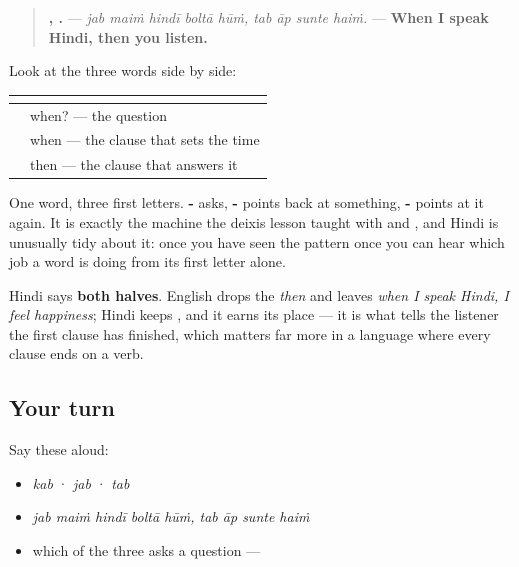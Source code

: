 \begin{grammarlens}[title={Grammar Lens: three first letters, one word}]
\begin{quote}
\textbf{    ,    .} — \emph{jab maiṁ hindī boltā hūṁ, tab āp sunte haiṁ.} — \textbf{When I speak Hindi, then you listen.}
\end{quote}

Look at the three words side by side:

\noindent
\begin{tabularx}{\linewidth}{@{}>{\raggedright\arraybackslash}X>{\raggedright\arraybackslash}X@{}}
\toprule
\textbf{} & \textbf{} \\
\midrule
\textbf{\hi{कब}} & when? — the question \\
\textbf{\hi{जब}} & when — the clause that sets the time \\
\textbf{\hi{तब}} & then — the clause that answers it \\
\bottomrule
\end{tabularx}

One word, three first letters. \textbf{-} asks, \textbf{-} points back at something, \textbf{-} points at it again. It is exactly the machine the deixis lesson taught with \textbf{} and \textbf{}, and Hindi is unusually tidy about it: once you have seen the pattern once you can hear which job a word is doing from its first letter alone.

Hindi says \textbf{both halves}. English drops the \emph{then} and leaves \emph{when I speak Hindi, I feel happiness}; Hindi keeps \textbf{}, and it earns its place — it is what tells the listener the first clause has finished, which matters far more in a language where every clause ends on a verb.
\end{grammarlens}

\subsection*{Your turn}
Say these aloud:

\begin{itemize}
\raggedright
  \item \emph{kab} · \emph{jab} · \emph{tab}
  \item \emph{jab maiṁ hindī boltā hūṁ, tab āp sunte haiṁ}
  \item which of the three asks a question — \textbf{}
\end{itemize}

